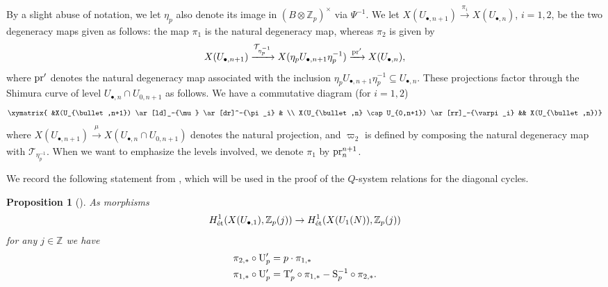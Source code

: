 \documentclass{amsart}
\numberwithin{equation}{section}
\newtheorem{proposition}[theorem]{Proposition}
\newcommand{\ZZ}{\mathbb{Z}}
\newcommand{\etale}{\textup{\'et}}
\begin{document}
\subsubsection{}
\label{subsubsec_A22_2025_06_30_1533}
By a slight abuse of notation, we let $\eta_p$ also denote its image in $(B \otimes \ZZ_p)^\times$ via $\Psi^{-1}$. We let $X(U_{\bullet,n+1}) \xrightarrow[]{\pi_i} X(U_{\bullet,n})$, $i=1,2$, be the two degeneracy maps given as follows: the map $\pi_1$ is the natural degeneracy map, whereas $\pi_2$ is given by 
\[X(U_{\bullet,n+1}) \xrightarrow[]{\mathcal{T}_{\eta_p^{-1}}} X(\eta_p U_{\bullet,n+1} \eta_p^{-1}  ) \xrightarrow[]{{\rm pr}'} X( U_{\bullet,n} ), \]
where ${\rm pr}'$ denotes the natural degeneracy map associated with the inclusion $\eta_p U_{\bullet,n+1} \eta_p^{-1}  \subseteq U_{\bullet,n}$. These projections factor through the Shimura curve of level $U_{\bullet,n} \cap U_{0,n+1}$ as follows. We have a commutative diagram (for $i=1,2$)
\[ \xymatrix{ &X(U_{\bullet,n+1}) \ar[ld]_-{\mu} \ar[dr]^-{\pi_i} & \\ X(U_{\bullet,n} \cap U_{0,n+1}) \ar[rr]_-{\varpi_i} && X(U_{\bullet,n})} \]
where $X(U_{\bullet,n+1}) \xrightarrow[]{\mu} X(U_{\bullet,n} \cap U_{0,n+1})$ denotes the natural projection, and $\varpi_2$ is defined by composing the natural degeneracy map with  $\mathcal{T}_{\eta_p^{-1}}$. When we want to emphasize the levels involved, we denote $\pi_1$ by ${\rm pr}^{n+1}_{n}$.

We record the following statement from \cite{KLZ2}, which will be used in the proof of the $Q$-system relations for the diagonal cycles.

\begin{proposition}[{\cite[Proposition 2.4.5]{KLZ2}}] \label{Prop_of_KLZ17}As morphisms $$H^1_{\etale}(X(U_{\bullet,1}),\ZZ_p(j)) \to H^1_{\etale}(X(U_1(N)),\ZZ_p(j))$$ for any $j \in \ZZ$ we have 
\begin{align*}
    \pi_{2,*} \circ {\rm U}_p' &= p \cdot   \pi_{1,*} \\ 
    \pi_{1,*} \circ {\rm U}_p' &= \mathrm{T}_p' \circ \pi_{1,*} -  \mathrm{S}_p^{-1} \circ  \pi_{2,*}. 
\end{align*}
    
\end{proposition}



\subsubsection{} 
\label{subsubsec_2027_07_02_1557}
\end{document}
